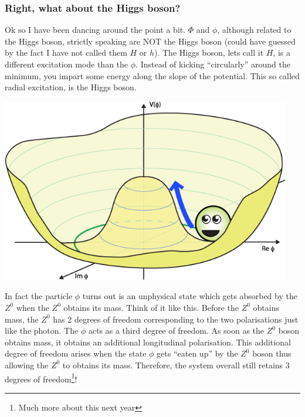 \subsubsection{Right, what about the Higgs boson?}
Ok so I have been dancing around the point a bit. $\Phi$ and $\phi$, although related to the Higgs boson, strictly speaking are NOT the Higgs boson (could have guessed by the fact I have not called them $H$ or $h$). The Higgs boson, lets call it $H$, is a different excitation mode than the $\phi$. Instead of kicking ``circularly'' around the minimum, you impart some energy along the slope of the potential. This so called radial excitation, is the Higgs boson. 
\begin{center}
\includegraphics[width=0.95\textwidth]{fig/higgs/phi_higgs.png}
\end{center}

In fact the particle $\phi$ turns out is an unphysical state which gets absorbed by the $Z^0$ when the $Z^0$ obtains its mass. Think of it like this. Before the $Z^0$ obtains mass, the $Z^0$ has 2 degrees of freedom corresponding to the two polarisations just like the photon. The $\phi$ acts as a third degree of freedom. As soon as the $Z^0$ boson obtains mass, it obtains an additional longitudinal polarisation. This additional degree of freedom arises when the state $\phi$ gets ``eaten up'' by the $Z^0$ boson thus allowing the $Z^0$ to obtains its mass. Therefore, the system overall still retains 3 degrees of freedom\footnote{Much more about this next year}! 

